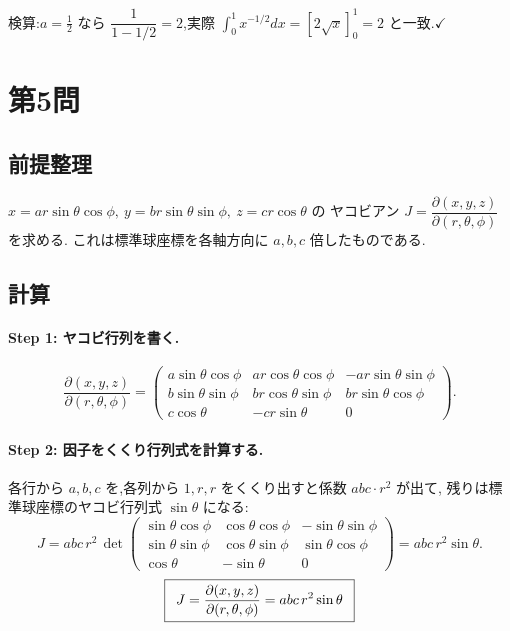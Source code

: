 \documentclass[11pt,a4paper]{article}
\begin{document}
検算:$a=\frac12$ なら $\dfrac{1}{1-1/2}=2$,実際
$\int_0^1 x^{-1/2}dx=[2\sqrt x]_0^1=2$ と一致.$\checkmark$

\section*{第5問}

\subsection*{前提整理}

$x=ar\sin\theta\cos\phi,\ y=br\sin\theta\sin\phi,\ z=cr\cos\theta$ の
ヤコビアン $J=\dfrac{\partial(x,y,z)}{\partial(r,\theta,\phi)}$ を求める.
これは標準球座標を各軸方向に $a,b,c$ 倍したものである.

\subsection*{計算}

\paragraph{Step 1: ヤコビ行列を書く.}
\[
\frac{\partial(x,y,z)}{\partial(r,\theta,\phi)}
=\begin{pmatrix}
a\sin\theta\cos\phi & ar\cos\theta\cos\phi & -ar\sin\theta\sin\phi\\
b\sin\theta\sin\phi & br\cos\theta\sin\phi & br\sin\theta\cos\phi\\
c\cos\theta & -cr\sin\theta & 0
\end{pmatrix}.
\]

\paragraph{Step 2: 因子をくくり行列式を計算する.}
各行から $a,b,c$ を,各列から $1,r,r$ をくくり出すと係数 $abc\cdot r^2$ が出て,
残りは標準球座標のヤコビ行列式 $\sin\theta$ になる:
\[
J=abc\,r^2\,
\det\!\begin{pmatrix}
\sin\theta\cos\phi & \cos\theta\cos\phi & -\sin\theta\sin\phi\\
\sin\theta\sin\phi & \cos\theta\sin\phi & \sin\theta\cos\phi\\
\cos\theta & -\sin\theta & 0
\end{pmatrix}
=abc\,r^2\sin\theta.
\]
\[
\ans{\ J=\dfrac{\partial(x,y,z)}{\partial(r,\theta,\phi)}=abc\,r^2\sin\theta\ }
\]
\end{document}
